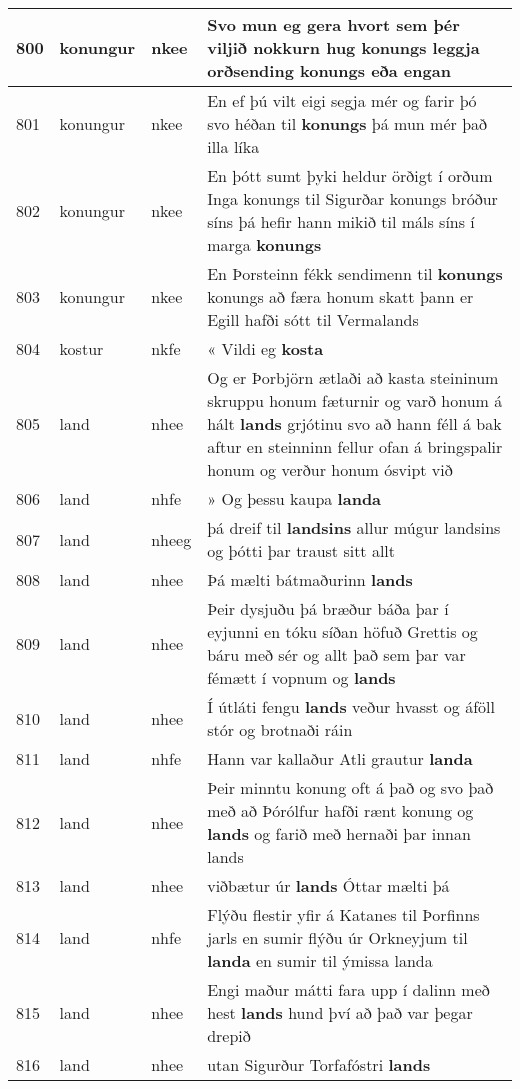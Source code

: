 \documentclass{article}
\begin{document}
\begin{longtable}{p{1cm}|p{1cm}|p{1cm}|p{13cm}}
\hline
800&konungur&nkee&Svo mun eg gera hvort sem þér viljið nokkurn hug \textbf{konungs} leggja orðsending konungs eða engan\\
\hline
801&konungur&nkee&En ef þú vilt eigi segja mér og farir þó svo héðan til \textbf{konungs} þá mun mér það illa líka\\
\hline
802&konungur&nkee&En þótt sumt þyki heldur örðigt í orðum Inga konungs til Sigurðar konungs bróður síns þá hefir hann mikið til máls síns í marga \textbf{konungs} \\
\hline
803&konungur&nkee&En Þorsteinn fékk sendimenn til \textbf{konungs} konungs að færa honum skatt þann er Egill hafði sótt til Vermalands\\
\hline
804&kostur&nkfe&« Vildi eg \textbf{kosta} \\
\hline
805&land&nhee&Og er Þorbjörn ætlaði að kasta steininum skruppu honum fæturnir og varð honum á hált \textbf{lands} grjótinu svo að hann féll á bak aftur en steinninn fellur ofan á bringspalir honum og verður honum ósvipt við\\
\hline
806&land&nhfe&» Og þessu kaupa \textbf{landa} \\
\hline
807&land&nheeg&þá dreif til \textbf{landsins} allur múgur landsins og þótti þar traust sitt allt\\
\hline
808&land&nhee&Þá mælti bátmaðurinn \textbf{lands} \\
\hline
809&land&nhee&Þeir dysjuðu þá bræður báða þar í eyjunni en tóku síðan höfuð Grettis og báru með sér og allt það sem þar var fémætt í vopnum og \textbf{lands} \\
\hline
810&land&nhee&Í útláti fengu \textbf{lands} veður hvasst og áföll stór og brotnaði ráin\\
\hline
811&land&nhfe&Hann var kallaður Atli grautur \textbf{landa} \\
\hline
812&land&nhee&Þeir minntu konung oft á það og svo það með að Þórólfur hafði rænt konung og \textbf{lands} og farið með hernaði þar innan lands\\
\hline
813&land&nhee&viðbætur úr \textbf{lands} Óttar mælti þá\\
\hline
814&land&nhfe&Flýðu flestir yfir á Katanes til Þorfinns jarls en sumir flýðu úr Orkneyjum til \textbf{landa} en sumir til ýmissa landa\\
\hline
815&land&nhee&Engi maður mátti fara upp í dalinn með hest \textbf{lands} hund því að það var þegar drepið\\
\hline
816&land&nhee&utan Sigurður Torfafóstri \textbf{lands} \\

\end{longtable}
\end{document}
